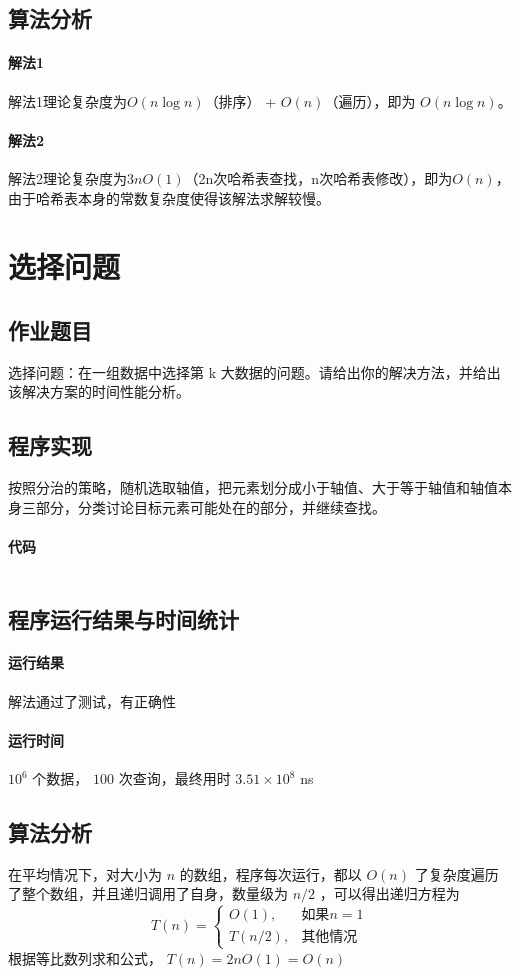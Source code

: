 \documentclass[UTF8]{ctexart}
\begin{document}
    \subsection{算法分析}
      \paragraph{解法1}
        解法1理论复杂度为$O(n\log n)$（排序） + $O(n)$（遍历），即为 $O(n\log n)$。
      \paragraph{解法2}
        解法2理论复杂度为$3nO(1)$（2n次哈希表查找，n次哈希表修改），即为$O(n)$，由于哈希表本身的常数复杂度使得该解法求解较慢。
  \section{选择问题}
    \subsection{作业题目}
      选择问题：在一组数据中选择第 k 大数据的问题。请给出你的解决方法，并给出该解决方案的时间性能分析。
    \subsection{程序实现}
      按照分治的策略，随机选取轴值，把元素划分成小于轴值、大于等于轴值和轴值本身三部分，分类讨论目标元素可能处在的部分，并继续查找。
      \paragraph{代码}
      \inputminted{java}{src/Problem5.java}
    \subsection{程序运行结果与时间统计}
      \paragraph{运行结果} 解法通过了测试，有正确性
      \paragraph{运行时间} $ 10 ^ 6 $ 个数据， $ 100 $ 次查询，最终用时 $3.51 \times 10 ^ 8$ ns
    \subsection{算法分析}
      在平均情况下，对大小为 $n$ 的数组，程序每次运行，都以 $O(n)$ 了复杂度遍历了整个数组，并且递归调用了自身，数量级为 $n/2$ ，可以得出递归方程为
      \begin{equation}
        T(n) =
        \begin{cases}
          O(1), & \text{如果$n=1$} \\
          T(n/2), & \text{其他情况}
        \end{cases}
      \end{equation}
      根据等比数列求和公式， $T(n) = 2nO(1) = O(n)$
\end{document}
